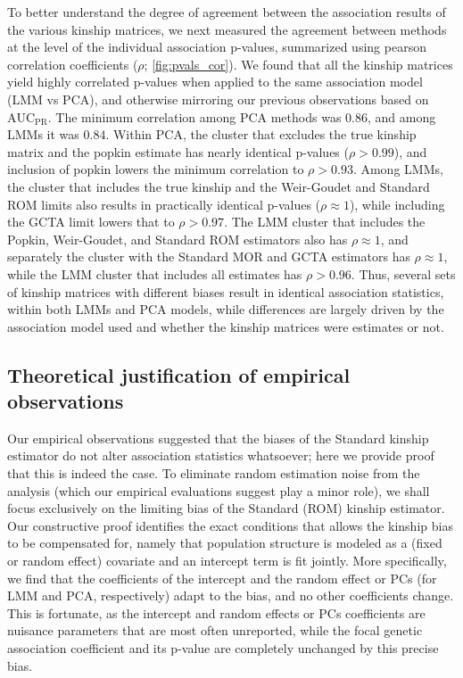 \documentclass[11pt]{article}
\newcommand{\auc}{\text{AUC}_\text{PR}}
\begin{document}
To better understand the degree of agreement between the association results of the various kinship matrices, we next measured the agreement between methods at the level of the individual association p-values, summarized using pearson correlation coefficients ($\rho$; \cref{fig:pvals_cor}).
We found that all the kinship matrices yield highly correlated p-values when applied to the same association model (LMM vs PCA), and otherwise mirroring our previous observations based on $\auc$.
The minimum correlation among PCA methods was $0.86$, and among LMMs it was $0.84$.
Within PCA, the cluster that excludes the true kinship matrix and the popkin estimate has nearly identical p-values ($\rho > 0.99$), and inclusion of popkin lowers the minimum correlation to $\rho > 0.93$.
Among LMMs, the cluster that includes the true kinship and the Weir-Goudet and Standard ROM limits also results in practically identical p-values ($\rho \approx 1$), while including the GCTA limit lowers that to $\rho > 0.97$.
The LMM cluster that includes the Popkin, Weir-Goudet, and Standard ROM estimators also has $\rho \approx 1$, and separately the cluster with the Standard MOR and GCTA estimators has $\rho \approx 1$, while the LMM cluster that includes all estimates has $\rho > 0.96$.
Thus, several sets of kinship matrices with different biases result in identical association statistics, within both LMMs and PCA models, while differences are largely driven by the association model used and whether the kinship matrices were estimates or not.


\subsection{Theoretical justification of empirical observations}

Our empirical observations suggested that the biases of the Standard kinship estimator do not alter association statistics whatsoever; here we provide proof that this is indeed the case.
To eliminate random estimation noise from the analysis (which our empirical evaluations suggest play a minor role), we shall focus exclusively on the limiting bias of the Standard (ROM) kinship estimator.
Our constructive proof identifies the exact conditions that allows the kinship bias to be compensated for, namely that population structure is modeled as a (fixed or random effect) covariate and an intercept term is fit jointly.
More specifically, we find that the coefficients of the intercept and the random effect or PCs (for LMM and PCA, respectively) adapt to the bias, and no other coefficients change.
This is fortunate, as the intercept and random effects or PCs coefficients are nuisance parameters that are most often unreported, while the focal genetic association coefficient and its p-value are completely unchanged by this precise bias.
\end{document}
